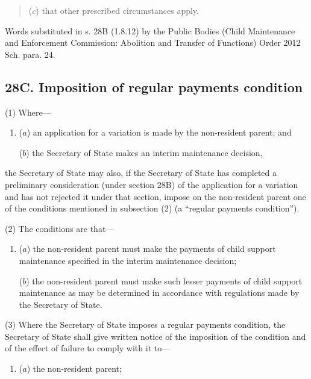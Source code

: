 \documentclass[12pt,a4paper]{article}
\begin{document}
{{\begin{quotation}
\begin{enumerate}

($c$) that other prescribed circumstances apply.
\end{enumerate}
\end{quotation}


Words substituted in s. 28B (1.8.12) by the Public Bodies (Child Maintenance and Enforcement Commission: Abolition and Transfer of Functions) Order 2012 Sch. para. 24.
}

\subsection{28C. Imposition of regular payments condition}

(1) Where---
\begin{enumerate}\item[]
($a$) an application for a variation is made by the non-resident parent; and

($b$) the Secretary of State makes an interim maintenance decision,
\end{enumerate}
the Secretary of State may also, if the Secretary of State has completed a
preliminary consideration (under section 28B) of the application for a variation
and has not rejected it under that section, impose on the non-resident parent one of
the conditions mentioned in subsection (2) (a “regular payments condition”).

(2) The conditions are that---
\begin{enumerate}\item[]
($a$) the non-resident parent must make the payments of child support
maintenance specified in the interim maintenance decision;

($b$) the non-resident parent must make such lesser payments of child support
maintenance as may be determined in accordance with regulations made
by the Secretary of State.
\end{enumerate}

(3) Where the Secretary of State imposes a regular payments condition, the
Secretary of State shall give written notice of the imposition of the condition and of
the effect of failure to comply with it to---
\begin{enumerate}\item[]
($a$) the non-resident parent;


\end{enumerate}}
\end{document}
